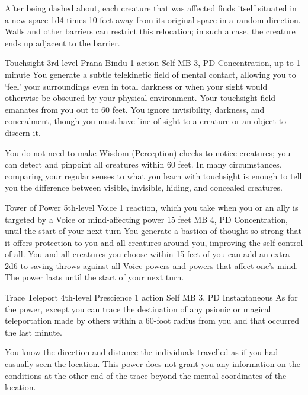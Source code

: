 After being dashed about,
each creature that was affected finds itself situated
in a new space 1d4 times 10 feet
away from its original space in a random direction.
Walls and other barriers can restrict this relocation;
in such a case,
the creature ends up adjacent to the barrier.

\DndPowerHeader%
  {Touchsight}
  {3rd-level Prana Bindu}
  {1 action}
  {Self}
  {MB 3, PD \lvlthree}
  {Concentration, up to 1 minute}
You generate a subtle telekinetic field of mental contact,
allowing you to `feel' your surroundings even in total darkness
or when your sight would otherwise be obscured
by your physical environment.
Your touchsight field emanates from you out to 60 feet.
You ignore invisibility, darkness, and concealment,
though you must have line of sight to a creature or an object
to discern it.

You do not need to make Wisdom (Perception) checks
to notice creatures; you can detect and pinpoint all creatures
within 60 feet.
In many circumstances, comparing your regular senses
to what you learn with touchsight is enough to tell you
the difference between visible, invisible, hiding,
and concealed creatures.

\DndPowerHeader%
  {Tower of Power}
  {5th-level Voice}
  {1 reaction, which you take when you or an ally is targeted by a Voice or mind-affecting power}
  {15 feet}
  {MB 4, PD \lvlfive}
  {Concentration, until the start of your next turn}
You generate a bastion of thought so strong
that it offers protection to you and all creatures around you,
improving the self-control of all.
You and all creatures you choose within 15 feet of you
can add an extra 2d6 to saving throws against all Voice powers
and powers that affect one's mind.
The power lasts until the start of your next turn.

\DndPowerHeader%
  {Trace Teleport}
  {4th-level Prescience}
  {1 action}
  {Self}
  {MB 3, PD \lvlfour}
  {Instantaneous}
As for the  power,
except you can trace the destination of any psionic
or magical teleportation made by others within
a 60-foot radius from you
and that occurred the last minute.

You know the direction and distance the individuals travelled
as if you had casually seen the location.
This power does not grant you any information on the conditions
at the other end of the trace
beyond the mental coordinates of the location.

